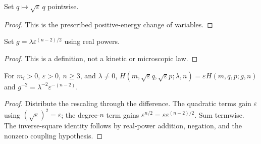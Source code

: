 \begin{definition}
\label{def:scaling:rescale-field}
Set $q\mapsto\sqrt\varepsilon\,q$ pointwise.
\end{definition}
\begin{proof}This is the prescribed positive-energy change of variables.\end{proof}

\begin{definition}
\label{def:scaling:effective-coupling}
Set $g=\lambda\varepsilon^{(n-2)/2}$ using real powers.
\end{definition}
\begin{proof}This is a definition, not a kinetic or microscopic law.\end{proof}

\begin{theorem}
\label{thm:physics:hamiltonian_scaling:target}
For $m_i>0$, $\varepsilon>0$, $n\ge3$, and $\lambda\ne0$,
$H(m,\sqrt\varepsilon q,\sqrt\varepsilon p;\lambda,n)=\varepsilon H(m,q,p;g,n)$ and $g^{-2}=\lambda^{-2}\varepsilon^{-(n-2)}$.
\end{theorem}
\begin{proof}
Distribute the rescaling through the difference. The quadratic terms gain $\varepsilon$ using $(\sqrt\varepsilon)^2=\varepsilon$; the degree-$n$ term gains $\varepsilon^{n/2}=\varepsilon\varepsilon^{(n-2)/2}$. Sum termwise. The inverse-square identity follows by real-power addition, negation, and the nonzero coupling hypothesis.
\end{proof}
